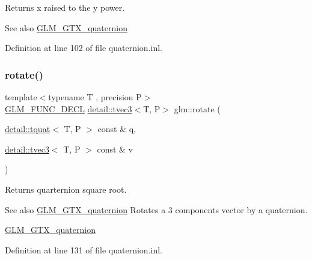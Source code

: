 Returns x raised to the y power.

\begin{DoxySeeAlso}{See also}
\hyperlink{group__gtx__quaternion}{G\+L\+M\+\_\+\+G\+T\+X\+\_\+quaternion} 
\end{DoxySeeAlso}


Definition at line 102 of file quaternion.\+inl.

\mbox{\label{group__gtx__quaternion_gaa4ac5806c1c001ac0247b1e1fd07dddf}} 
\subsubsection{\texorpdfstring{rotate()}{rotate()}\hspace{0.1cm}{\footnotesize\ttfamily [1/2]}}
{\footnotesize\ttfamily template$<$typename T , precision P$>$ \\
\hyperlink{setup_8hpp_ab2d052de21a70539923e9bcbf6e83a51}{G\+L\+M\+\_\+\+F\+U\+N\+C\+\_\+\+D\+E\+CL} \hyperlink{structglm_1_1detail_1_1tvec3}{detail\+::tvec3}$<$T, P$>$ glm\+::rotate (\begin{DoxyParamCaption}\item[{\hyperlink{structglm_1_1detail_1_1tquat}{detail\+::tquat}$<$ T, P $>$ const \&}]{q,  }\item[{\hyperlink{structglm_1_1detail_1_1tvec3}{detail\+::tvec3}$<$ T, P $>$ const \&}]{v }\end{DoxyParamCaption})}

Returns quarternion square root.

\begin{DoxySeeAlso}{See also}
\hyperlink{group__gtx__quaternion}{G\+L\+M\+\_\+\+G\+T\+X\+\_\+quaternion} Rotates a 3 components vector by a quaternion.

\hyperlink{group__gtx__quaternion}{G\+L\+M\+\_\+\+G\+T\+X\+\_\+quaternion} 
\end{DoxySeeAlso}


Definition at line 131 of file quaternion.\+inl.

\mbox{\label{group__gtx__quaternion_ga3461e43b8c7da533b10bc5e9961add80}} 

